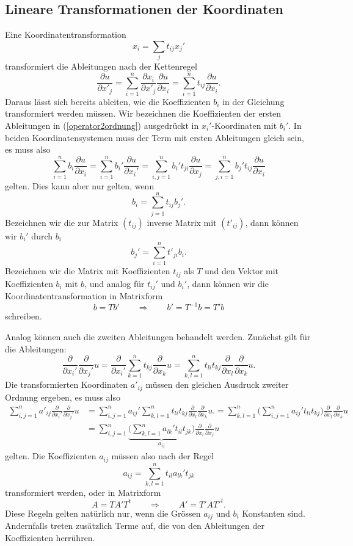 \subsection{Lineare Transformationen der Koordinaten
\label{lineare-transformation}}
Eine Koordinatentransformation
\[
x_i=\sum_{j}t_{ij}x_j'
\]
transformiert die Ableitungen nach der Kettenregel
\[
\frac{\partial u}{\partial x'_j}
=
\sum_{i=1}^n
\frac{\partial x_i}{\partial x'_j} \frac{\partial u}{\partial x_i}
=
\sum_{i=1}^nt_{ij}\frac{\partial u}{\partial x_i}.
\]
Daraus lässt sich bereits ableiten, wie die Koeffizienten $b_i$ in der
Gleichung transformiert werden müssen.
Wir bezeichnen die Koeffizienten der ersten Ableitungen in
(\ref{operator2ordnung}) ausgedrückt in $x_i'$-Koordinaten mit
$b_i'$.
In beiden Koordinatensystemen muss der Term mit ersten Ableitungen gleich
sein, es muss also
\[
\sum_{i=1}^n b_i\frac{\partial u}{\partial x_i}
=
\sum_{i=1}^n b_i'\frac{\partial u}{\partial x_i'}
=
\sum_{i,j=1}^n b_i't_{ji}\frac{\partial u}{\partial x_j}
=
\sum_{j,i=1}^n b_j't_{ij}\frac{\partial u}{\partial x_i}
\]
gelten.
Dies kann aber nur gelten, wenn
\[
b_i = \sum_{j=1}^n t_{ij}b_j'.
\]
Bezeichnen wir die zur Matrix $(t_{ij})$ inverse Matrix mit $(t'_{ij})$,
dann können wir $b_i'$ durch $b_i$ 
\[
b_j'=\sum_{i=1}^n t'_{ji}b_i.
\]
Bezeichnen wir die Matrix mit Koeffizienten $t_{ij}$ als $T$ und den 
Vektor mit Koeffizienten $b_i$ mit $b$, und analog für $t_{ij}'$ und
$b_i'$, dann können wir die Koordinatentransformation in Matrixform
\[
b=Tb'
\qquad\Rightarrow\qquad
b'=T^{-1}b=T'b
\]
schreiben.

Analog können auch die zweiten Ableitungen behandelt werden.
Zunächst gilt für die Ableitungen:
\[
\frac{\partial}{\partial x_i'}\frac{\partial}{\partial x_j'} u
=
\frac{\partial}{\partial x_i'}
\sum_{k=1}^nt_{kj}\frac{\partial}{\partial x_k}u
=
\sum_{k,l=1}^nt_{li}t_{kj}\frac{\partial}{\partial x_l}\frac{\partial}{\partial x_k}u.
\]
Die transformierten Koordinaten $a'_{ij}$ müssen den gleichen Ausdruck
zweiter Ordnung ergeben, es muss also
\begin{align*}
\sum_{i,j=1}^n
a'_{ij}\frac{\partial}{\partial x_i'}\frac{\partial}{\partial x_j'} u
&=
\sum_{i,j=1}^n
a_{ij}'
\sum_{k,l=1}^n
t_{li}t_{kj}\frac{\partial}{\partial x_l}\frac{\partial}{\partial x_k}u.
=
\sum_{k,l=1}^n
\biggl(
\sum_{i,j=1}^n
a_{ij}'
t_{li}t_{kj}
\biggr)
\frac{\partial}{\partial x_l}\frac{\partial}{\partial x_k}u
\\
&=
\sum_{i,j=1}^n
\underbrace{
\biggl(
\sum_{k,l=1}^n
a_{lk}'
t_{il}t_{jk}
\biggr)}_{\textstyle a_{ij}}
\frac{\partial}{\partial x_i}\frac{\partial}{\partial x_j}u
\end{align*}
gelten.
Die Koeffizienten $a_{ij}$ müssen also nach der Regel
\[
a_{ij}=\sum_{k,l=1}^n t_{il}a_{lk}'t_{jk}
\]
transformiert werden, oder in Matrixform
\[
A=TA'T^t
\qquad\Rightarrow\qquad
A'=T'AT'^t.
\]
Diese Regeln gelten natürlich nur, wenn die Grössen $a_{ij}$ und $b_i$
Konstanten sind.
Andernfalls treten zusätzlich Terme auf, die von den Ableitungen der
Koeffizienten herrühren.

